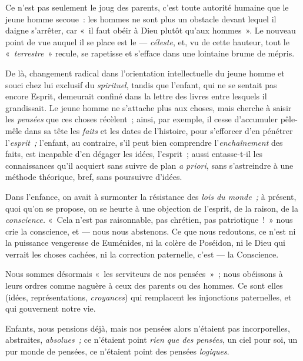 \documentclass[french,twoside]{book} %
\begin{document}
Ce n’est pas seulement le joug des parents, c’est toute autorité humaine que le jeune homme secoue : les hommes ne sont plus un obstacle devant lequel il daigne s’arrêter, car « il faut obéir à Dieu plutôt qu’aux hommes ». Le nouveau point de vue auquel il se place est le — \emph{céleste}, et, vu de cette hauteur, tout le « \emph{terrestre} » recule, se rapetisse et s’efface dans une lointaine brume de mépris.\par
De là, changement radical dans l’orientation intellectuelle du jeune homme et souci chez lui exclusif  du \emph{spirituel}, tandis que l’enfant, qui ne se sentait pas encore Esprit, demeurait confiné dans la lettre des livres entre lesquels il grandissait. Le jeune homme ne s’attache plus aux choses, mais cherche à saisir les \emph{pensées} que ces choses récèlent ; ainsi, par exemple, il cesse d’accumuler pêle-mêle dans sa tête les \emph{faits} et les dates de l’histoire, pour s’efforcer d’en pénétrer l’\emph{esprit ; }l’enfant, au contraire, s’il peut bien comprendre l’\emph{enchaînement} des faits, est incapable d’en dégager les idées, l’esprit ; aussi entasse-t-il les connaissances qu’il acquiert sans suivre de plan \emph{a priori}, sans s’astreindre à une méthode théorique, bref, sans poursuivre d’idées.\par
Dans l’enfance, on avait à surmonter la résistance des \emph{lois du monde ;} à présent, quoi qu’on se propose, on se heurte à une objection de l’esprit, de la raison, de la \emph{conscience.} « Cela n’est pas raisonnable, pas chrétien, pas patriotique ! » nous crie la conscience, et — nous nous abstenons. Ce que nous redoutons, ce n’est ni la puissance vengeresse de Euménides, ni la colère de Poséidon, ni le Dieu qui verrait les choses cachées, ni la correction paternelle, c’est — la Conscience.\par
Nous sommes désormais « les serviteurs de nos pensées » ; nous obéissons à leurs ordres comme naguère à ceux des parents ou des hommes. Ce sont elles (idées, représentations, \emph{croyances}) qui remplacent les injonctions paternelles, et qui gouvernent notre vie.\par
Enfants, nous pensions déjà, mais nos pensées alors n’étaient pas incorporelles, abstraites, \emph{absolues ; }ce n’étaient point \emph{rien que des pensées}, un ciel pour soi, un pur monde de pensées, ce n’étaient point des pensées \emph{logiques}.\par
\end{document}
